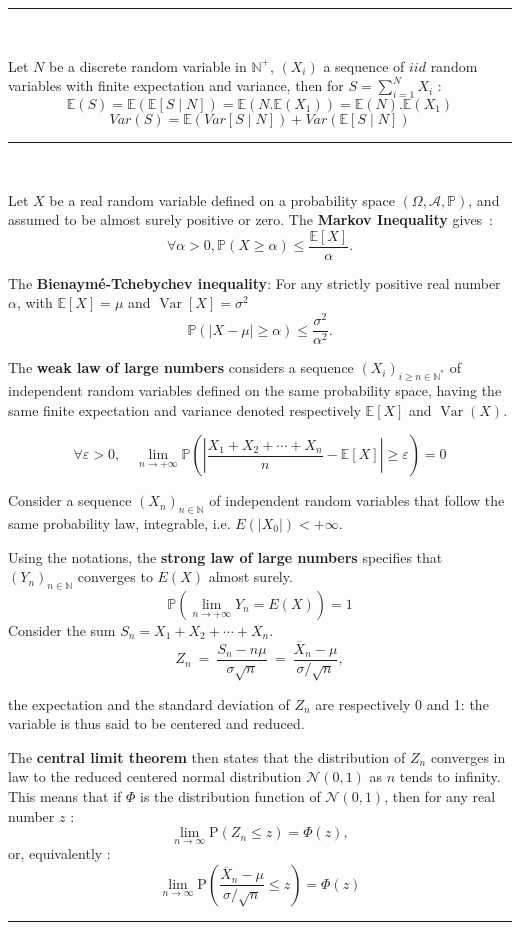 \hrule
\begin{f}
	{\ }
	
	Let $N$ be a discrete random variable in $\mathbb{N}^+$, $\left(X_i\right)$ a sequence of $iid$ random variables with finite expectation and variance, then for $\displaystyle S=\sum_{i=1}^{N}X_i$ :
	$$
	\mathbb{E}(S) = \mathbb{E} (\mathbb{E} [S \mid N]) = \mathbb{E} (N.\mathbb{E}(X_1)) = \mathbb{E}(N).\mathbb{E}(X_1)
	$$
	$$
	Var (S) = \mathbb{E} (Var [S \mid N]) + Var (\mathbb{E} [S \mid N])
	$$
\end{f}

\hrule
\begin{f} {\ }
	
	Let $X$ be a real random variable defined on a probability space $\left(\Omega,\mathcal A,\mathbb P\right)$, and assumed to be almost surely positive or zero. The \textbf{Markov Inequality} gives~:
	$$
	\forall \alpha >0, \mathbb P(X\geq \alpha)\leqslant\frac{\mathbb{E}[X]}{\alpha}.
	$$
	
	The \textbf{Bienaymé-Tchebychev inequality}: 
	For any strictly positive real number $\alpha$, with $\mathbb{E}[X]=\mu$ and $\operatorname{Var}[X]=\sigma^2$
	$$
	\mathbb{P}\left(\left|X-\mu\right| \geq \alpha \right) \leq \frac{\sigma^2}{\alpha^2}.
	$$
	
	The \textbf{weak law of large numbers} considers a sequence $(X_i)_{i\geq n\in\mathbb{N}^*}$ of independent random variables defined on the same probability space, having the same finite expectation and variance denoted respectively $\mathbb{E}[X]$ and $\operatorname{Var}(X)$.
	
	$$
	\forall\varepsilon>0,\quad \lim_{n \to +\infty} \mathbb{P}\left(\left|\frac{X_1+X_2+\cdots+X_n}{n} - \mathbb{E}[X]\right| \geq \varepsilon\right) = 0
	$$
	
	Consider a sequence $(X_n)_{n\in \mathbb{N}}$ of independent random variables that follow the same probability law, integrable, i.e. $E(|X_0|)<+\infty$.
	
	Using the notations, the \textbf{strong law of large numbers} specifies that $(Y_n)_{n\in\mathbb{N}}$ converges to $E(X)$ \og{} almost surely\fg{}.
	$$
	\mathbb{P}\left(\lim_{n \to +\infty} Y_n = E(X)\right)=1
	$$
	Consider the sum $S_n = X_1 + X_2 + \cdots + X_n$.
	$$   
	Z_n\ =\ \frac{S_n - n \mu}{\sigma \sqrt{n}}\ =\ \frac{\overline{X}_n-\mu}{\sigma/\sqrt{n}},
	$$
	
	the expectation and the standard deviation of $Z_n$ are respectively 0 and 1: the variable is thus said to be centered and reduced.
	
	The \textbf{central limit theorem} then states that the distribution of $Z_n$ converges in law to the reduced centered normal distribution $\mathcal{N} (0 , 1)$ as $n$ tends to infinity. This means that if $\Phi$ is the distribution function of $\mathcal{N} (0 , 1)$, then for any real number $z$ :
	$$
	\lim_{n \to \infty} \mbox{P}(Z_n \le z) = \Phi(z),
	$$
	or, equivalently :
	$$
	\lim_{n\to\infty}\mbox{P}\left(\frac{\overline{X}_n-\mu}{\sigma/\sqrt{n}}\leq z\right)=\Phi(z)
	$$
\end{f}
\hrule

